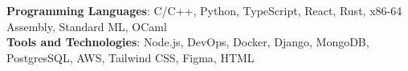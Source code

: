 \begin{itemize}[leftmargin=0in, label={}]
    \small{\item{
     \textbf{Programming Languages}{:  C/C++, Python, TypeScript, React,
     Rust, x86-64 Assembly, Standard ML, OCaml} \\
     \textbf{Tools and Technologies}{: Node.js, DevOps, Docker, Django, MongoDB,
     PostgresSQL, AWS, Tailwind
     CSS, Figma, HTML} \\
    }}
\end{itemize}